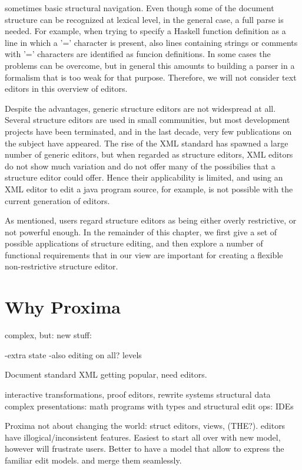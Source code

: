 \bc
sometimes basic structural navigation.  Even though some of the document structure can be recognized at lexical level, in the general case, a full parse is needed. For example, when trying to specify a Haskell function definition as a line in which a '=' character is present, also lines containing strings or comments with '=' characters are identified as funcion definitions. In some cases the problems can be overcome, but in general this amounts to building a parser in a formalism that is too weak for that purpose. Therefore, we will not consider text editors in this overview of editors.
\ec

Despite the advantages, generic structure editors are not widespread at all. Several structure editors are used in small communities, but most development projects have been terminated, and in the last decade, very few publications on the subject have appeared. The rise of the XML standard has spawned a large number of generic editors, but when regarded as structure editors, XML editors do not show much variation and do not offer many of the possibilies that a structure editor could offer. Hence their applicability is limited, and using an XML editor to edit a java program source, for example, is not possible with the current generation of editors.

As mentioned, users regard structure editors as being either overly restrictive, or not powerful enough. In the remainder of this chapter, we first give a set of possible applications of structure editing, and then explore a number of functional requirements that in our view are important for creating a flexible non-restrictive structure editor.

\section{Why Proxima}


complex, but:
new stuff:

-extra state
-also editing on all? levels

Document standard XML getting popular, need editors.

interactive transformations, proof editors, rewrite systems
structural data complex presentations: math
programs with types and structural edit ops: IDEs

Proxima not about changing the world: struct editors, views, (THE?). editors have illogical/inconsistent features. Easiest to start all over with new model, however will frustrate users. Better to have a model that allow to express the familiar edit models. and merge them seamlessly.




